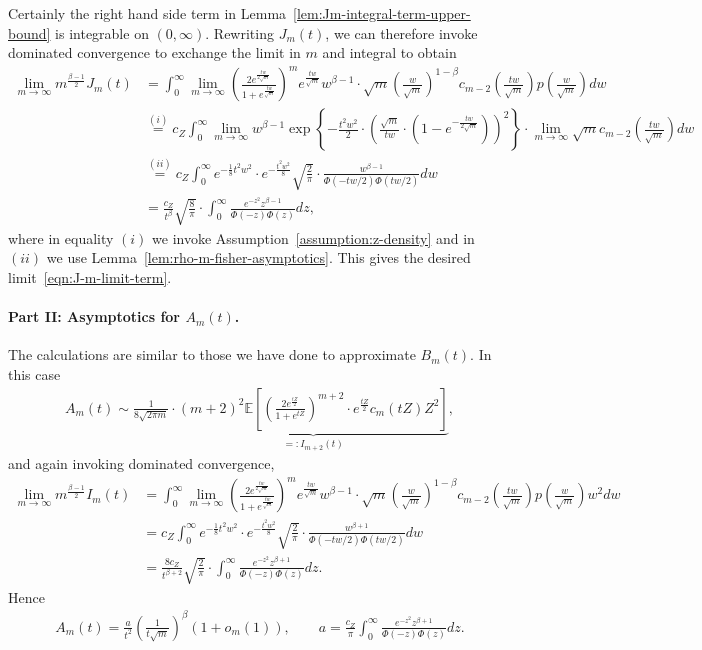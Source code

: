 \documentclass[11pt]{article}
\newcommand{\E}{\mathbb{E}}
\newcommand{\brc}[1]{\left\{{#1}\right\}}
\newcommand{\prn}[1]{\left({#1}\right)} %
\newcommand{\brk}[1]{\left[{#1}\right]} %
\newcommand{\<}{\langle} %
\renewcommand{\>}{\rangle}
\begin{document}
Certainly the right hand side term in
Lemma~\ref{lem:Jm-integral-term-upper-bound} is integrable on $(0, \infty)$.
Rewriting $J_m(t)$, we can therefore invoke dominated convergence to
exchange the limit in $m$ and integral to obtain
\begin{align*}
	\lim_{m \to \infty} m^{\frac{\beta-1}{2}} J_m(t) & = \int_0^\infty \lim_{m \to \infty} \prn{\frac{2e^{\frac{tw}{2\sqrt{m}}}}{1 + e^{\frac{tw}{\sqrt{m}}}}}^{m} e^{\frac{tw}{\sqrt{m}}} w^{\beta-1}  \cdot \sqrt{m}  \prn{\frac{w}{\sqrt{m}}}^{1-\beta} c_{m-2}\prn{\frac{tw}{\sqrt{m}}} p \prn{\frac{w}{\sqrt{m}}} dw \nonumber \\
	& \stackrel{(i)}{=}  c_Z \int_0^\infty \lim_{m \to \infty} w^{\beta-1} \exp \brc{-\frac{t^2w^2}{2} \cdot \prn{\frac{\sqrt{m}}{tw} \cdot \prn{1-e^{-\frac{tw}{2\sqrt{m}}}}}^2 } \cdot \lim_{m \to \infty} \sqrt{m} c_{m-2}\prn{\frac{tw}{\sqrt{m}}} dw \nonumber \\
	& \stackrel{(ii)}{=} c_Z \int_0^\infty e^{-\frac{1}{8}t^2w^2} \cdot  e^{-\frac{t^2 w^2}{8}} \sqrt{\frac{2}{\pi}} \cdot \frac{w^{\beta-1}}{\Phi(-tw/2) \Phi(tw/2)} dw \nonumber \\
	& = \frac{c_Z}{t^\beta} \sqrt{\frac{8}{\pi}} \cdot \int_0^\infty \frac{e^{-z^2} z^{\beta-1}}{\Phi(-z) \Phi(z)} dz,
\end{align*}
where in equality $(i)$ we invoke Assumption~\ref{assumption:z-density} and
in $(ii)$ we use Lemma~\ref{lem:rho-m-fisher-asymptotics}. This
gives the desired limit~\eqref{eqn:J-m-limit-term}.

\paragraph{Part II: Asymptotics for $A_m(t)$.}
The calculations are similar to those we have done to approximate
$B_m(t)$. In this case
\begin{align*}
	A_m(t) \sim \frac{1}{8\sqrt{2\pi m}} \cdot \underbrace{(m+2)^2 \E \brk{\prn{\frac{2 e^{\frac{tZ}{2}}}{1 + e^{tZ}}}^{m+2}\cdot e^{\frac{tZ}{2}} c_m(tZ) Z^2}}_{=:I_{m+2}(t)},
\end{align*}
and again invoking dominated convergence,
\begin{align*}
  \lim_{m \to \infty}  m^{\frac{\beta-1}{2}} I_m(t) & = \int_0^\infty \lim_{m \to \infty} \prn{\frac{2e^{\frac{tw}{2\sqrt{m}}}}{1 + e^{\frac{tw}{\sqrt{m}}}}}^{m} e^{\frac{tw}{\sqrt{m}}} w^{\beta-1}  \cdot \sqrt{m}  \prn{\frac{w}{\sqrt{m}}}^{1-\beta} c_{m-2}\prn{\frac{tw}{\sqrt{m}}} p \prn{\frac{w}{\sqrt{m}}} w^2 dw \nonumber \\
  & = c_Z \int_0^\infty e^{-\frac{1}{8}t^2w^2} \cdot e^{-\frac{t^2 w^2}{8}} \sqrt{\frac{2}{\pi}} \cdot \frac{w^{\beta+1}}{\Phi(-tw/2) \Phi(tw/2)} dw \nonumber  \\
  &  = \frac{8 c_Z}{t^{\beta+2}} \sqrt{\frac{2}{\pi}} \cdot \int_0^\infty \frac{e^{-z^2} z^{\beta+1}}{\Phi(-z) \Phi(z)} dz.
\end{align*}
Hence
\begin{align*}
	A_m(t) = \frac{a}{t^2} \prn{\frac{1}{t\sqrt{m}}}^{\beta} (1 + o_m(1)), \qquad a = \frac{c_Z}{ \pi} \int_0^\infty \frac{e^{-z^2} z^{\beta+1}}{\Phi(-z) \Phi(z)} dz.
\end{align*}
\end{document}

